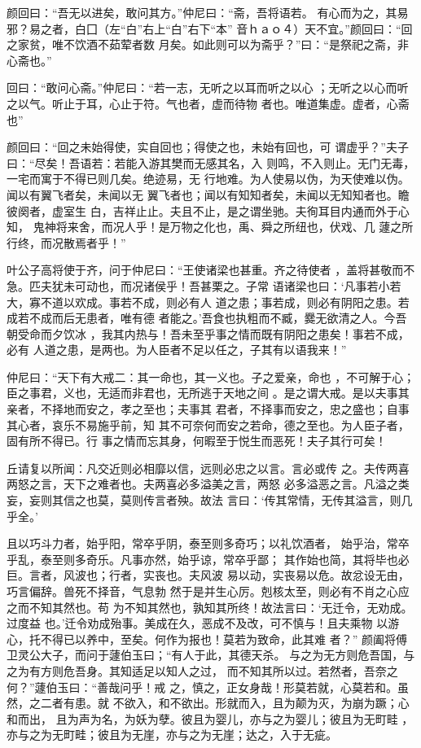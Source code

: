 \documentclass[12pt,UTF8]{ctexbook}
\begin{document}
颜回曰：“吾无以进矣，敢问其方。”仲尼曰：“斋，吾将语若。 有心而为之，其易邪？易之者，白囗（左“白”右上“白”右下“本” 音ｈａｏ４）天不宜。”颜回曰：“回之家贫，唯不饮酒不茹荤者数 月矣。如此则可以为斋乎？”曰：“是祭祀之斋，非心斋也。”

回曰：“敢问心斋。”仲尼曰：“若一志，无听之以耳而听之以心 ；无听之以心而听之以气。听止于耳，心止于符。气也者，虚而待物 者也。唯道集虚。虚者，心斋也”

颜回曰：“回之未始得使，实自回也；得使之也，未始有回也，可 谓虚乎？”夫子曰：“尽矣！吾语若：若能入游其樊而无感其名，入 则鸣，不入则止。无门无毒，一宅而寓于不得已则几矣。绝迹易，无 行地难。为人使易以伪，为天使难以伪。闻以有翼飞者矣，未闻以无 翼飞者也；闻以有知知者矣，未闻以无知知者也。瞻彼阕者，虚室生 白，吉祥止止。夫且不止，是之谓坐驰。夫徇耳目内通而外于心知， 鬼神将来舍，而况人乎！是万物之化也，禹、舜之所纽也，伏戏、几 蘧之所行终，而况散焉者乎！”

叶公子高将使于齐，问于仲尼曰：“王使诸梁也甚重。齐之待使者 ，盖将甚敬而不急。匹夫犹未可动也，而况诸侯乎！吾甚栗之。子常 语诸梁也曰：‘凡事若小若大，寡不道以欢成。事若不成，则必有人 道之患；事若成，则必有阴阳之患。若成若不成而后无患者，唯有德 者能之。’吾食也执粗而不臧，爨无欲清之人。今吾朝受命而夕饮冰 ，我其内热与！吾未至乎事之情而既有阴阳之患矣！事若不成，必有 人道之患，是两也。为人臣者不足以任之，子其有以语我来！”

仲尼曰：“天下有大戒二：其一命也，其一义也。子之爱亲，命也 ，不可解于心；臣之事君，义也，无适而非君也，无所逃于天地之间 。是之谓大戒。是以夫事其亲者，不择地而安之，孝之至也；夫事其 君者，不择事而安之，忠之盛也；自事其心者，哀乐不易施乎前，知 其不可奈何而安之若命，德之至也。为人臣子者，固有所不得已。行 事之情而忘其身，何暇至于悦生而恶死！夫子其行可矣！

丘请复以所闻：凡交近则必相靡以信，远则必忠之以言。言必或传 之。夫传两喜两怒之言，天下之难者也。夫两喜必多溢美之言，两怒 必多溢恶之言。凡溢之类妄，妄则其信之也莫，莫则传言者殃。故法 言曰：‘传其常情，无传其溢言，则几乎全。’

且以巧斗力者，始乎阳，常卒乎阴，泰至则多奇巧；以礼饮酒者， 始乎治，常卒乎乱，泰至则多奇乐。凡事亦然，始乎谅，常卒乎鄙； 其作始也简，其将毕也必巨。言者，风波也；行者，实丧也。夫风波 易以动，实丧易以危。故忿设无由，巧言偏辞。兽死不择音，气息勃 然于是并生心厉。剋核太至，则必有不肖之心应之而不知其然也。苟 为不知其然也，孰知其所终！故法言曰：‘无迁令，无劝成。过度益 也。’迁令劝成殆事。美成在久，恶成不及改，可不慎与！且夫乘物 以游心，托不得已以养中，至矣。何作为报也！莫若为致命，此其难 者？” 颜阖将傅卫灵公大子，而问于蘧伯玉曰；“有人于此，其德天杀。 与之为无方则危吾国，与之为有方则危吾身。其知适足以知人之过， 而不知其所以过。若然者，吾奈之何？”蘧伯玉曰：“善哉问乎！戒 之，慎之，正女身哉！形莫若就，心莫若和。虽然，之二者有患。就 不欲入，和不欲出。形就而入，且为颠为灭，为崩为蹶；心和而出， 且为声为名，为妖为孽。彼且为婴儿，亦与之为婴儿；彼且为无町畦 ，亦与之为无町畦；彼且为无崖，亦与之为无崖；达之，入于无疵。
\end{document}

